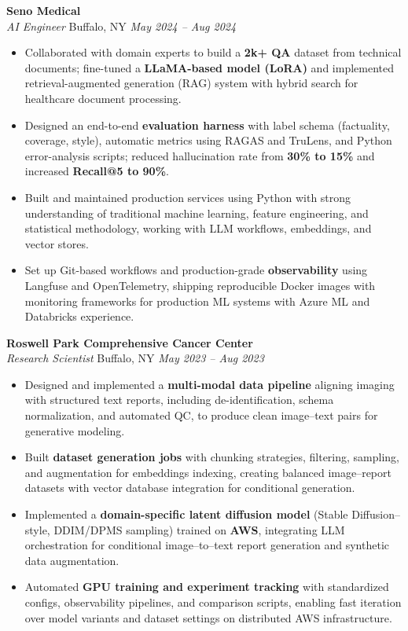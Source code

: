 \vspace*{-1pt}
\item \textbf{Seno Medical}\\
\textit{AI Engineer} \hfill Buffalo, NY \quad \textit{May 2024 -- Aug 2024}
\vspace*{-3pt}
\begin{itemize}[leftmargin=0.2in, topsep=1pt]
  \item Collaborated with domain experts to build a \textbf{2k+ QA} dataset from technical documents; fine-tuned a \textbf{LLaMA-based model (LoRA)} and implemented retrieval-augmented generation (RAG) system with hybrid search for healthcare document processing.
  \item Designed an end-to-end \textbf{evaluation harness} with label schema (factuality, coverage, style), automatic metrics using RAGAS and TruLens, and Python error-analysis scripts; reduced hallucination rate from \textbf{30\% to 15\%} and increased \textbf{Recall@5 to 90\%}.
  \item Built and maintained production services using Python with strong understanding of traditional machine learning, feature engineering, and statistical methodology, working with LLM workflows, embeddings, and vector stores.
  \item Set up Git-based workflows and production-grade \textbf{observability} using Langfuse and OpenTelemetry, shipping reproducible Docker images with monitoring frameworks for production ML systems with Azure ML and Databricks experience.
\end{itemize}

\vspace*{-1pt}
\item \textbf{Roswell Park Comprehensive Cancer Center}\\
\textit{Research Scientist} \hfill Buffalo, NY \quad \textit{May 2023 -- Aug 2023}
\vspace*{-3pt}
\begin{itemize}[leftmargin=0.2in, topsep=1pt]
  \item Designed and implemented a \textbf{multi-modal data pipeline} aligning imaging with structured text reports, including de-identification, schema normalization, and automated QC, to produce clean image–text pairs for generative modeling.
  \item Built \textbf{dataset generation jobs} with chunking strategies, filtering, sampling, and augmentation for embeddings indexing, creating balanced image–report datasets with vector database integration for conditional generation.
  \item Implemented a \textbf{domain-specific latent diffusion model} (Stable Diffusion–style, DDIM/DPMS sampling) trained on \textbf{AWS}, integrating LLM orchestration for conditional image–to–text report generation and synthetic data augmentation.
  \item Automated \textbf{GPU training and experiment tracking} with standardized configs, observability pipelines, and comparison scripts, enabling fast iteration over model variants and dataset settings on distributed AWS infrastructure.
\end{itemize}
